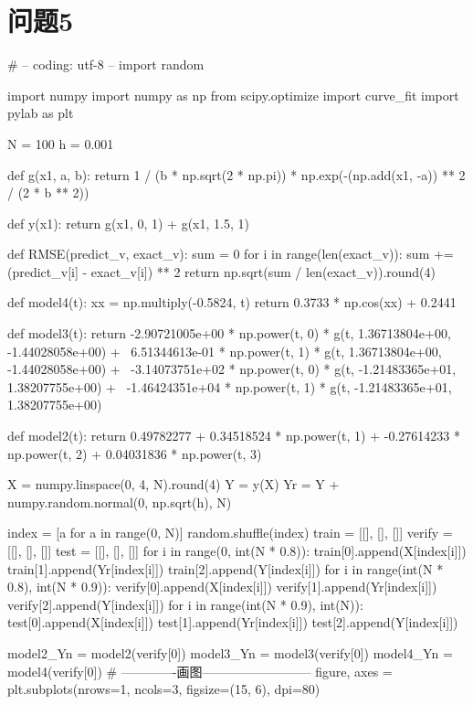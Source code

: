 \section{问题5}
\begin{python}
    
    # -- coding: utf-8 --
import random

import numpy
import numpy as np
from scipy.optimize import curve_fit
import pylab as plt

N = 100
h = 0.001


def g(x1, a, b):
    return 1 / (b * np.sqrt(2 * np.pi)) * np.exp(-(np.add(x1, -a)) ** 2 / (2 * b ** 2))


def y(x1):
    return g(x1, 0, 1) + g(x1, 1.5, 1)


def RMSE(predict_v, exact_v):
    sum = 0
    for i in range(len(exact_v)):
        sum += (predict_v[i] - exact_v[i]) ** 2
    return np.sqrt(sum / len(exact_v)).round(4)


def model4(t):
    xx = np.multiply(-0.5824, t)
    return 0.3733 * np.cos(xx) + 0.2441


def model3(t):
    return -2.90721005e+00 * np.power(t, 0) * g(t, 1.36713804e+00, -1.44028058e+00) + \
           6.51344613e-01 * np.power(t, 1) * g(t, 1.36713804e+00, -1.44028058e+00) + \
           -3.14073751e+02 * np.power(t, 0) * g(t, -1.21483365e+01, 1.38207755e+00) + \
           -1.46424351e+04 * np.power(t, 1) * g(t, -1.21483365e+01, 1.38207755e+00)


def model2(t):
    return 0.49782277 + 0.34518524 * np.power(t, 1) + -0.27614233 * np.power(t, 2) + 0.04031836 * np.power(t, 3)


X = numpy.linspace(0, 4, N).round(4)
Y = y(X)
Yr = Y + numpy.random.normal(0, np.sqrt(h), N)

index = [a for a in range(0, N)]
random.shuffle(index)
train = [[], [], []]
verify = [[], [], []]
test = [[], [], []]
for i in range(0, int(N * 0.8)):
    train[0].append(X[index[i]])
    train[1].append(Yr[index[i]])
    train[2].append(Y[index[i]])
for i in range(int(N * 0.8), int(N * 0.9)):
    verify[0].append(X[index[i]])
    verify[1].append(Yr[index[i]])
    verify[2].append(Y[index[i]])
for i in range(int(N * 0.9), int(N)):
    test[0].append(X[index[i]])
    test[1].append(Yr[index[i]])
    test[2].append(Y[index[i]])

model2_Yn = model2(verify[0])
model3_Yn = model3(verify[0])
model4_Yn = model4(verify[0])
# -------------画图--------------------------
figure, axes = plt.subplots(nrows=1, ncols=3, figsize=(15, 6), dpi=80)


\end{python}
